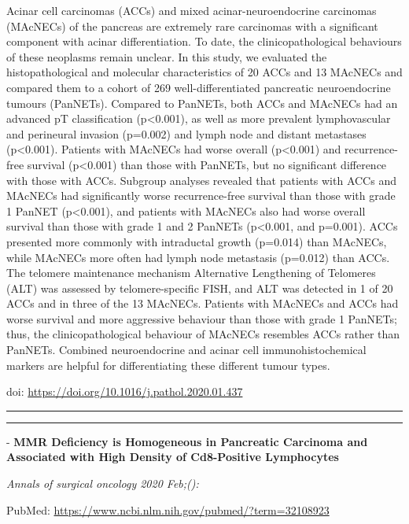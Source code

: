 \documentclass[
]{article}
\begin{document}
Acinar cell carcinomas (ACCs) and mixed acinar-neuroendocrine carcinomas
(MAcNECs) of the pancreas are extremely rare carcinomas with a
significant component with acinar differentiation. To date, the
clinicopathological behaviours of these neoplasms remain unclear. In
this study, we evaluated the histopathological and molecular
characteristics of 20 ACCs and 13 MAcNECs and compared them to a cohort
of 269 well-differentiated pancreatic neuroendocrine tumours (PanNETs).
Compared to PanNETs, both ACCs and MAcNECs had an advanced pT
classification (p\textless0.001), as well as more prevalent
lymphovascular and perineural invasion (p=0.002) and lymph node and
distant metastases (p\textless0.001). Patients with MAcNECs had worse
overall (p\textless0.001) and recurrence-free survival (p\textless0.001)
than those with PanNETs, but no significant difference with those with
ACCs. Subgroup analyses revealed that patients with ACCs and MAcNECs had
significantly worse recurrence-free survival than those with grade 1
PanNET (p\textless0.001), and patients with MAcNECs also had worse
overall survival than those with grade 1 and 2 PanNETs (p\textless0.001,
and p=0.001). ACCs presented more commonly with intraductal growth
(p=0.014) than MAcNECs, while MAcNECs more often had lymph node
metastasis (p=0.012) than ACCs. The telomere maintenance mechanism
Alternative Lengthening of Telomeres (ALT) was assessed by
telomere-specific FISH, and ALT was detected in 1 of 20 ACCs and in
three of the 13 MAcNECs. Patients with MAcNECs and ACCs had worse
survival and more aggressive behaviour than those with grade 1 PanNETs;
thus, the clinicopathological behaviour of MAcNECs resembles ACCs rather
than PanNETs. Combined neuroendocrine and acinar cell
immunohistochemical markers are helpful for differentiating these
different tumour types.

doi: \url{https://doi.org/10.1016/j.pathol.2020.01.437}

\begin{center}\rule{0.5\linewidth}{0.5pt}\end{center}

\begin{center}\rule{0.5\linewidth}{0.5pt}\end{center}

- \textbf{MMR Deficiency is Homogeneous in Pancreatic Carcinoma and
Associated with High Density of Cd8-Positive Lymphocytes}

\emph{Annals of surgical oncology 2020 Feb;():}

PubMed: \url{https://www.ncbi.nlm.nih.gov/pubmed/?term=32108923}
\end{document}
